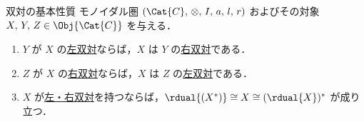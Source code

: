 \documentclass[TQFT_main]{subfiles}
\begin{document}
\begin{mylem}[label=lem:duals]{双対の基本性質}
    モノイダル圏 $(\Cat{C},\, \otimes,\, I,\, a,\, l,\, r)$ およびその対象 $X,\, Y,\, Z \in \Obj{\Cat{C}}$ を与える．
    \begin{enumerate}
        \item $Y$ が $X$ の\hyperref[redef:dual]{左双対}ならば，$X$ は $Y$ の\hyperref[redef:dual]{右双対}である．
        \item $Z$ が $X$ の\hyperref[redef:dual]{右双対}ならば，$X$ は $Z$ の\hyperref[redef:dual]{左双対}である．
        \item $X$ が\hyperref[redef:dual]{左・右双対}を持つならば，$\rdual{(X^*)} \cong X \cong (\rdual{X})^*$ が成り立つ．
    \end{enumerate}
\end{mylem}
\end{document}
